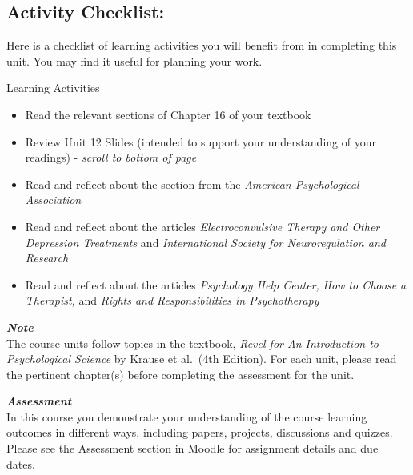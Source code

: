 \documentclass[
]{book}
\providecommand{\tightlist}{%
  \setlength{\itemsep}{0pt}\setlength{\parskip}{0pt}}
\begin{document}
\hypertarget{activity-checklist-11}{%
\subsection*{Activity Checklist:}\label{activity-checklist-11}}

Here is a checklist of learning activities you will benefit from in completing this unit. You may find it useful for planning your work.

\begin{reflect}
{Learning Activities}

\begin{itemize}
\tightlist
\item
  Read the relevant sections of Chapter 16 of your textbook
\item
  Review Unit 12 Slides (intended to support your understanding of your readings) - \emph{scroll to bottom of page}
\item
  Read and reflect about the section from the \emph{American Psychological Association}
\item
  Read and reflect about the articles \emph{Electroconvulsive Therapy and Other Depression Treatments} and \emph{International Society for Neuroregulation and Research}
\item
  Read and reflect about the articles \emph{Psychology Help Center,} \emph{How to Choose a Therapist,} and \emph{Rights and Responsibilities in Psychotherapy}
\end{itemize}
\end{reflect}

\begin{caution}
\textbf{\emph{Note}}\\
The course units follow topics in the textbook, \emph{Revel for An Introduction to Psychological Science} by Krause et al.~(4th Edition). For each unit, please read the pertinent chapter(s) before completing the assessment for the unit.
\end{caution}

\begin{assessment}
\textbf{\emph{Assessment}}\\
In this course you demonstrate your understanding of the course learning outcomes in different ways, including papers, projects, discussions and quizzes. Please see the Assessment section in Moodle for assignment details and due dates.
\end{assessment}
\end{document}
